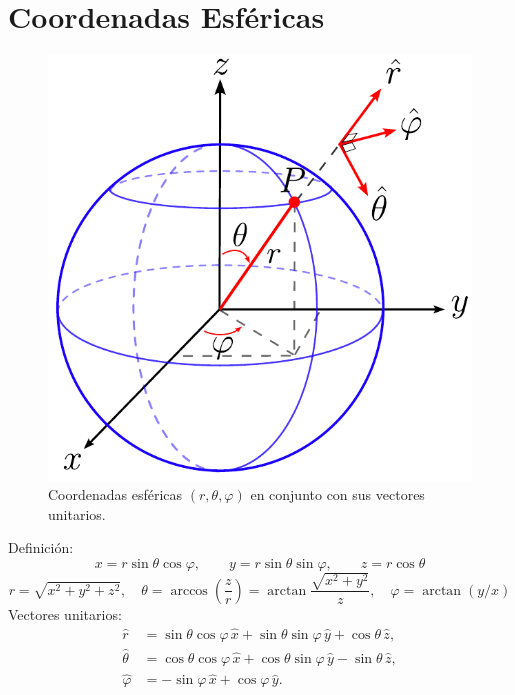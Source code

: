 \section{Coordenadas Esféricas}
\begin{figure}[H]
    \centering
    \includegraphics[scale = 0.5]{fig/Coordenadas-Esfericas.pdf}
    \caption{Coordenadas esféricas $(r,\theta,\varphi)$ en conjunto con sus vectores unitarios.}
    \label{fig:Coordenadas-Esfericas}
\end{figure}
\noindent Definición:
\begin{equation}
    x  =  r\sin\theta\cos\varphi, \qquad
    y  =  r\sin\theta\sin\varphi , \qquad
    z  =  r\cos\theta
\end{equation}
\begin{equation}
    r  =  \sqrt{x^2 + y^2 + z^2} , \quad
    \theta  =  \arccos(\frac{z}{r}) = \arctan{\frac{\sqrt{x^2+y^2}}{z}}, \quad
    \varphi  =  \arctan{(y/x)}
\end{equation}
Vectores unitarios:
\begin{align}
    \hat{r} &= %
    			\sin \theta \cos \varphi \,\hat{x} + \sin \theta \sin \varphi \,\hat{y} + \cos \theta \,\hat{z}, \label{rxyz} \\
    \hat{\theta} &= %
    			\cos \theta \cos \varphi \,\hat{x} + \cos \theta \sin \varphi \,\hat{y} - \sin \theta   \,\hat{z},  \\
    \hat{\varphi} &= %
    			- \sin \varphi \,\hat{x} + \cos \varphi \,\hat{y} . \label{varphixyz}
\end{align}
